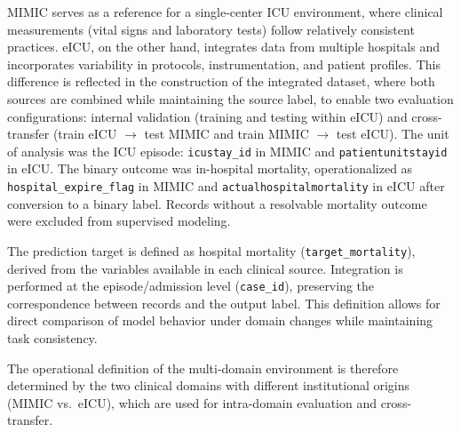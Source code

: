 \documentclass[utf8]{FrontiersinHarvard} %
\begin{document}
MIMIC serves as a reference for a single-center ICU environment, where clinical measurements (vital signs and laboratory tests) follow relatively consistent practices. eICU, on the other hand, integrates data from multiple hospitals and incorporates variability in protocols, instrumentation, and patient profiles. This difference is reflected in the construction of the integrated dataset, where both sources are combined while maintaining the source label, to enable two evaluation configurations: internal validation (training and testing within eICU) and cross-transfer (train eICU $\rightarrow$ test MIMIC and train MIMIC $\rightarrow$ test eICU). The unit of analysis was the ICU episode: \texttt{icustay\_id} in MIMIC and \texttt{patientunitstayid} in eICU. The binary outcome was in-hospital mortality, operationalized as \texttt{hospital\_expire\_flag} in MIMIC and \texttt{actualhospitalmortality} in eICU after conversion to a binary label. Records without a resolvable mortality outcome were excluded from supervised modeling.

The prediction target is defined as hospital mortality (\texttt{target\_mortality}), derived from the variables available in each clinical source. Integration is performed at the episode/admission level (\texttt{case\_id}), preserving the correspondence between records and the output label. This definition allows for direct comparison of model behavior under domain changes while maintaining task consistency.

The operational definition of the multi-domain environment is therefore determined by the two clinical domains with different institutional origins (MIMIC vs.\ eICU), which are used for intra-domain evaluation and cross-transfer.
\end{document}
